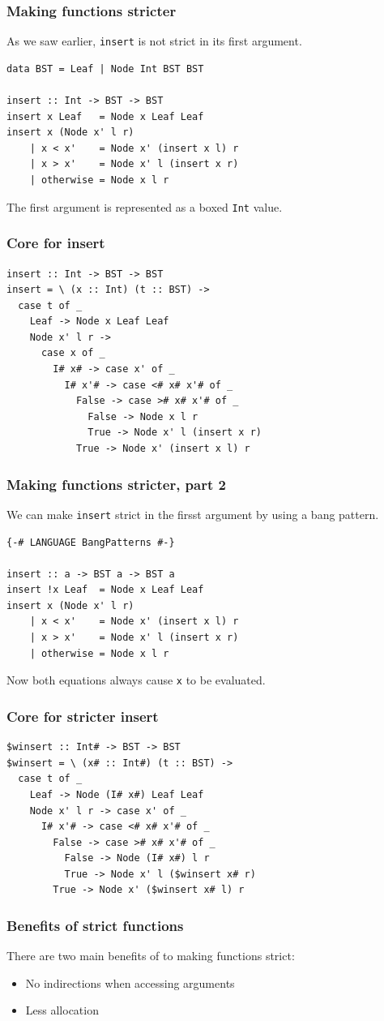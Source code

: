 \documentclass{beamer}
\begin{document}
\begin{frame}[fragile]
  \frametitle{Making functions stricter}

  As we saw earlier, \lstinline!insert! is not strict in its first
  argument.
  \begin{lstlisting}
data BST = Leaf | Node Int BST BST

insert :: Int -> BST -> BST
insert x Leaf   = Node x Leaf Leaf
insert x (Node x' l r)
    | x < x'    = Node x' (insert x l) r
    | x > x'    = Node x' l (insert x r)
    | otherwise = Node x l r
  \end{lstlisting}
  The first argument is represented as a boxed \lstinline!Int! value.
\end{frame}

\begin{frame}[fragile]
  \frametitle{Core for insert}

  \begin{verbatim}
insert :: Int -> BST -> BST
insert = \ (x :: Int) (t :: BST) ->
  case t of _
    Leaf -> Node x Leaf Leaf
    Node x' l r ->
      case x of _
        I# x# -> case x' of _
          I# x'# -> case <# x# x'# of _
            False -> case ># x# x'# of _
              False -> Node x l r
              True -> Node x' l (insert x r)
            True -> Node x' (insert x l) r
  \end{verbatim}
\end{frame}

\begin{frame}[fragile]
  \frametitle{Making functions stricter, part 2}

  We can make \lstinline!insert! strict in the firsst argument by
  using a bang pattern.
  \begin{lstlisting}
{-# LANGUAGE BangPatterns #-}

insert :: a -> BST a -> BST a
insert !x Leaf  = Node x Leaf Leaf
insert x (Node x' l r)
    | x < x'    = Node x' (insert x l) r
    | x > x'    = Node x' l (insert x r)
    | otherwise = Node x l r
  \end{lstlisting}
  Now both equations always cause \lstinline!x! to be evaluated.
\end{frame}

\begin{frame}[fragile]
  \frametitle{Core for stricter insert}

  \begin{verbatim}
$winsert :: Int# -> BST -> BST
$winsert = \ (x# :: Int#) (t :: BST) ->
  case t of _
    Leaf -> Node (I# x#) Leaf Leaf
    Node x' l r -> case x' of _
      I# x'# -> case <# x# x'# of _
        False -> case ># x# x'# of _
          False -> Node (I# x#) l r
          True -> Node x' l ($winsert x# r)
        True -> Node x' ($winsert x# l) r
  \end{verbatim}
\end{frame}

\begin{frame}[fragile]
  \frametitle{Benefits of strict functions}

  There are two main benefits of to making functions strict:
  \begin{itemize}
  \item No indirections when accessing arguments
  \item Less allocation
  \end{itemize}
\end{frame}
\end{document}
